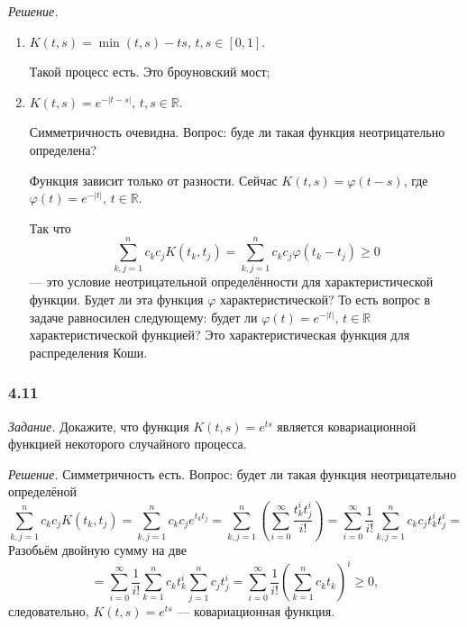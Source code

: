 \textit{Решение.}
\begin{enumerate}[label=\alph*)]
  \item $K \left( t, s \right) = \min \left( t, s \right) - ts, \, t, s \in \left[ 0, 1 \right] $.

  Такой процесс есть.
  Это броуновский мост;
  \item $K \left( t, s \right) = e^{- \left| t - s \right| }, \, t, s \in \mathbb{R}$.

  Симметричность очевидна.
  Вопрос: буде ли такая функция неотрицательно определена?

  Функция зависит только от разности.
  Сейчас $K \left( t, s \right) = \varphi \left( t - s \right) $,
  где $ \varphi \left( t \right) = e^{-\left| t \right| }, \, t \in \mathbb{R}$.

  Так что
  $$ \sum \limits_{k, j = 1}^n c_k c_j K \left( t_k, t_j \right) =
    \sum \limits_{k, j = 1}^n c_k c_j \varphi \left( t_k - t_j \right) \geq
    0$$
  --- это условие неотрицательной определённости для характеристической функции.
  Будет ли эта функция $ \varphi $ характеристической?
  То есть вопрос в задаче равносилен следующему:
  будет ли $ \varphi \left( t \right) = e^{-\left| t \right| }, \, t \in \mathbb{R}$
  характеристической функцией?
  Это характеристическая функция для распределения Коши.
\end{enumerate}

\subsubsection*{4.11}

\textit{Задание.}
Докажите, что функция $K \left( t, s \right) = e^{ts}$
является ковариационной функцией некоторого случайного процесса.

\textit{Решение.}
Симметричность есть.
Вопрос: будет ли такая функция неотрицательно определёной
$$ \sum \limits_{k, j = 1}^n c_k c_j K \left( t_k, t_j \right) =
  \sum \limits_{k, j = 1}^n c_k c_j e^{t_k t_j} =
  \sum \limits_{k, j = 1}^n \left( \sum \limits_{i = 0}^{ \infty } \frac{t_k^i t_j^i}{i!} \right) =
  \sum \limits_{i = 0}^{ \infty } \frac{1}{i!} \sum \limits_{k, j = 1}^n c_k c_j t_k^i t_j^i =$$
Разобьём двойную сумму на две
$$= \sum \limits_{i = 0}^{ \infty } \frac{1}{i!} \sum \limits_{k = 1}^n c_k t_k^i
  \sum \limits_{j = 1}^n c_j t_j^i =
  \sum \limits_{i = 0}^{ \infty } \frac{1}{i!} \left( \sum \limits_{k = 1}^n c_k t_k \right)^i \geq
  0,$$
следовательно, $K \left( t, s \right) = e^{ts}$ --- ковариационная функция.

